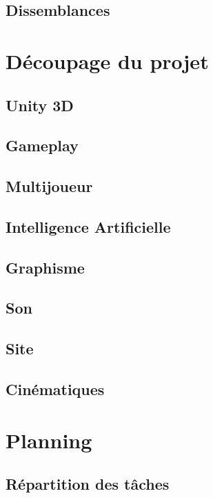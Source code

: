\documentclass[11pt]{article} %
\begin{document}
\subsection{Dissemblances}

\section{Découpage du projet}

\subsection{Unity 3D}

\subsection{Gameplay}

\subsection{Multijoueur}

\subsection{Intelligence Artificielle}

\subsection{Graphisme}

\subsection{Son}

\subsection{Site}

\subsection{Cinématiques}

\section{Planning}

\subsection{Répartition des tâches}
\end{document}
